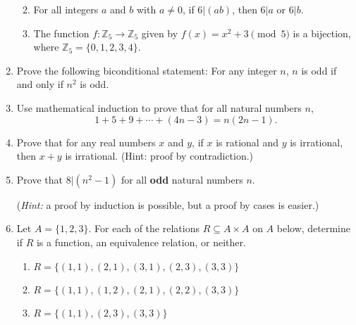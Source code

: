\documentclass[12pt]{article}
\newcommand{\points}[1]{\marginpar{\hspace{24pt}[#1]}}
\newcommand{\Z}{\mathbb{Z}}
\begin{document}
\begin{enumerate}
\begin{enumerate}
\vspace{2.5in}

 \item For all integers $a$ and $b$ with $a\neq 0$, if $6|(ab)$, then $6|a$ or $6|b$. \points{2}

\vspace{2in}

 \item The function $f:\Z_5\to \Z_5$ given by $f(x) = x^2+3 \pmod{5}$ is a bijection, where $\Z_5=\{0,1,2,3,4\}$. \points{5}
\end{enumerate}
\newpage

\item Prove the following biconditional statement: For any integer $n$, $n$ is odd if and only if $n^2$ is odd. \points{4}

\vspace{2.5in}

\item Use mathematical induction to prove that for all natural numbers $n$,\points{6}
\[
 1+5+9+\cdots + (4n-3) = n(2n-1).
\]
\newpage

\item Prove that for any real numbers $x$ and $y$, if $x$ is rational and $y$ is irrational, then $x+y$ is irrational. (Hint: proof by contradiction.) \points{5}




\vspace{3.5in}

\item Prove that $8|(n^2-1)$ for all {\bf odd} natural numbers $n$.\points{5}

({\em Hint:} a proof by induction is possible, but a proof by cases is easier.)

\newpage

\item Let $A=\{1,2,3\}$. For each of the relations $R\subseteq A\times A$ on $A$ below, determine if $R$ is a function, an equivalence relation, or neither.
\begin{enumerate}
 \item $R=\{(1,1),(2,1), (3,1), (2,3), (3,3)\}$ \points{3}

\vspace{1.75in}

 \item $R=\{(1,1), (1,2), (2,1), (2,2), (3,3)\}$ \points{3}

\vspace{1.75in}

 \item $R=\{(1,1), (2,3), (3,3)\}$ \points{3}
\end{enumerate}
\vspace{1.5in}


\end{enumerate}
\end{document}

